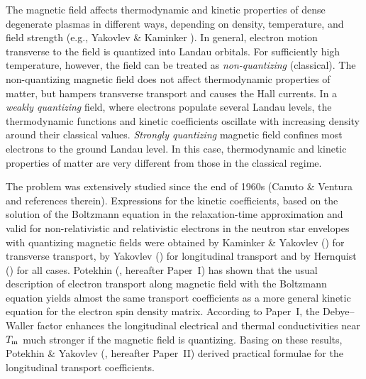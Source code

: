 \documentclass{aa}
\begin{document}
The magnetic field affects thermodynamic and kinetic properties
of dense degenerate plasmas in different ways,
depending on density, temperature, and field strength
(e.g., Yakovlev \& Kaminker \cite{yk94}).
In general,
electron motion transverse to the field is quantized
into Landau orbitals.
For sufficiently high temperature, however,
the field can be treated as \emph{non-quantizing} (classical).
The non-quantizing magnetic field
does not affect thermodynamic properties
of matter, but hampers transverse transport
and causes the Hall currents.
In a \emph{weakly quantizing} field, where electrons populate several
Landau levels, the thermodynamic functions and kinetic coefficients
oscillate with increasing density around their classical values.
\emph{Strongly quantizing} magnetic field
confines most electrons to the ground Landau level.
In this case, thermodynamic and kinetic properties of matter
are very different from those in the classical regime.

The problem was extensively studied since the end of 1960s
(Canuto \& Ventura \cite{cv77} and references therein).
Expressions for the kinetic coefficients,
based on the solution of the Boltzmann equation
in the relaxation-time approximation
and valid for non-relativistic and relativistic electrons
in the neutron star envelopes with quantizing
magnetic fields were obtained
by Kaminker \& Yakovlev (\cite{kayak}) for transverse transport,
by Yakovlev (\cite{yak84}) for longitudinal transport
and by Hernquist (\cite{hern84}) for all cases.
Potekhin (\cite{p96}, hereafter Paper~I) has shown that
the usual description of electron transport along magnetic field
with the Boltzmann equation yields almost the same
transport coefficients as
a more general kinetic equation for the electron
spin density matrix.
According to Paper~I, the Debye--Waller factor
enhances the longitudinal electrical and thermal
conductivities near $T_{\rm m}$
much stronger if the magnetic field is quantizing.
Basing on these results,
Potekhin \& Yakovlev (\cite{py96}, hereafter Paper~II)
derived practical formulae
for the longitudinal transport coefficients.
\end{document}
